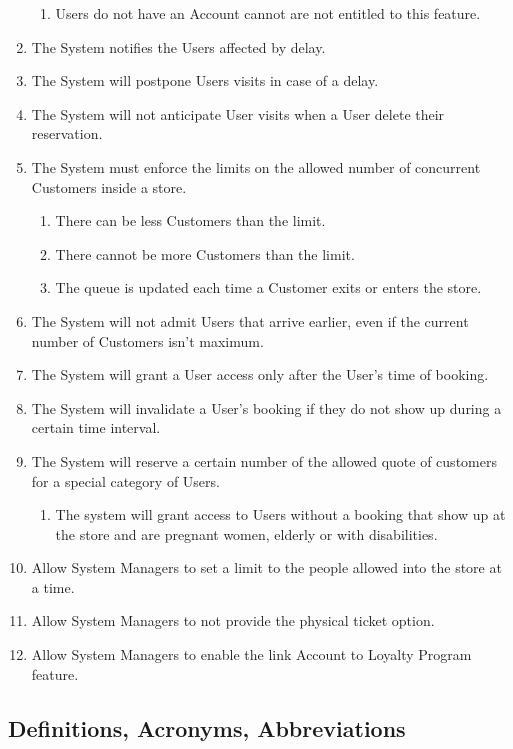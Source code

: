 \begin{enumerate}
\begin{enumerate}
            \item Users do not have an Account cannot are not entitled to this feature.
        \end{enumerate}
    \item The System notifies the Users affected by delay.
    \item The System will postpone Users visits in case of a delay.
    \item The System will not anticipate User visits when a User delete their reservation.
    \item The System must enforce the limits on the allowed number of concurrent Customers inside a store.
        \begin{enumerate}
            \item There can be less Customers than the limit.
            \item There cannot be more Customers than the limit.
            \item The queue is updated each time a Customer exits or enters the store.
        \end{enumerate}
    \item The System will not admit Users that arrive earlier, even if the current number of Customers isn't maximum.
    \item The System will grant a User access only after the User's time of booking.
    \item The System will invalidate a User's booking if they do not show up during a certain time interval.
    \item The System will reserve a certain number of the allowed quote of customers for a special category of Users.
        \begin{enumerate}
            \item The system will grant access to Users without a booking that show up at the store and are pregnant women, elderly or with disabilities.
        \end{enumerate}
    \item Allow System Managers to set a limit to the people allowed into the store at a time.
    \item Allow System Managers to not provide the physical ticket option.
    \item Allow System Managers to enable the link Account to Loyalty Program feature.
\end{enumerate}

\subsection{Definitions, Acronyms, Abbreviations}

